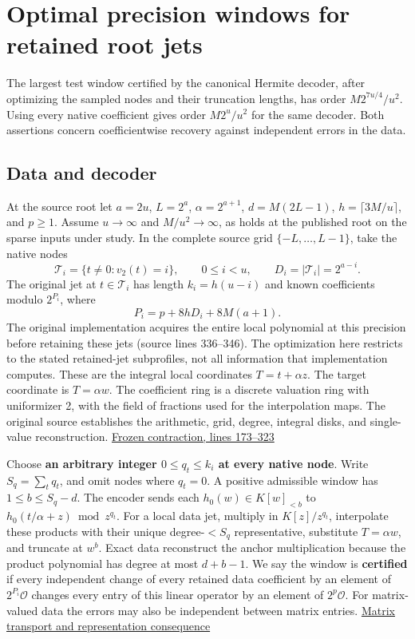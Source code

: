 \documentclass[
  11pt,
]{article}
\begin{document}
\section{Optimal precision windows for retained root
jets}\label{optimal-precision-windows-for-retained-root-jets}

The largest test window certified by the canonical Hermite decoder,
after optimizing the sampled nodes and their truncation lengths, has
order \(M2^{7u/4}/u^2\). Using every native coefficient gives order
\(M2^u/u^2\) for the same decoder. Both assertions concern
coefficientwise recovery against independent errors in the data.

\subsection{Data and decoder}\label{data-and-decoder}

At the source root let \(a=2u\), \(L=2^a\), \(\alpha=2^{a+1}\),
\(d=M(2L-1)\), \(h=\lceil3M/u\rceil\), and \(p\ge1\). Assume
\(u\to\infty\) and \(M/u^2\to\infty\), as holds at the published root on
the sparse inputs under study. In the complete source grid
\(\{-L,\ldots,L-1\}\), take the native nodes \[
 \mathcal T_i=\{t\ne0:v_2(t)=i\},\qquad
 0\le i<u,\qquad D_i=|\mathcal T_i|=2^{a-i}.
\] The original jet at \(t\in\mathcal T_i\) has length \(k_i=h(u-i)\)
and known coefficients modulo \(2^{P_i}\), where \[
 P_i=p+8hD_i+8M(a+1).
\] The original implementation acquires the entire local polynomial at
this precision before retaining these jets (source lines 336--346). The
optimization here restricts to the stated retained-jet subprofiles, not
all information that implementation computes. These are the integral
local coordinates \(T=t+\alpha z\). The target coordinate is
\(T=\alpha w\). The coefficient ring is a discrete valuation ring with
uniformizer 2, with the field of fractions used for the interpolation
maps. The original source establishes the arithmetic, grid, degree,
integral disks, and single-value reconstruction.
\href{https://github.com/openai/math/blob/main/preprints/The-Exponential-Time-Hypothesis-is-False-October-25-2026/build/quantitative-contraction.tex\#L173-L323}{Frozen
contraction, lines 173--323}

Choose \textbf{an arbitrary integer \(0\le q_t\le k_i\) at every native
node}. Write \(S_q=\sum_tq_t\), and omit nodes where \(q_t=0\). A
positive admissible window has \(1\le b\le S_q-d\). The encoder sends
each \(h_0(w)\in K[w]_{<b}\) to \(h_0(t/\alpha+z)\bmod z^{q_t}\). For a
local data jet, multiply in \(K[z]/z^{q_t}\), interpolate these products
with their unique degree-\(<S_q\) representative, substitute
\(T=\alpha w\), and truncate at \(w^b\). Exact data reconstruct the
anchor multiplication because the product polynomial has degree at most
\(d+b-1\). We say the window is \textbf{certified} if every independent
change of every retained data coefficient by an element of
\(2^{P_i}\mathcal O\) changes every entry of this linear operator by an
element of \(2^p\mathcal O\). For matrix-valued data the errors may also
be independent between matrix entries.
\href{https://github.com/dch-and-Elara/some-research-inspired-by-openais-eth-preprint/tree/main/rank-budget-barriers}{Matrix transport and representation
consequence}
\end{document}

